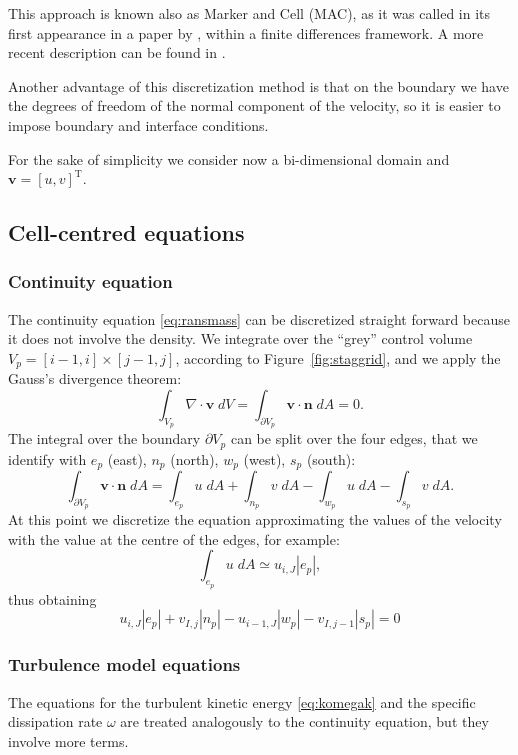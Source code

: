 This approach is known also as Marker and Cell (MAC), as it was called in its 
first appearance in a paper by \textcite{stagg:orig}, within a finite 
differences framework. A more recent description can be found in 
\cite{main:vermal}.

Another advantage of this discretization method is that on the boundary we have 
the degrees of freedom of the normal component of the velocity, so it is easier 
to impose boundary and interface conditions.

For the sake of simplicity we consider now a bi-dimensional domain and 
$\mathbf{v} = [u, v]^{\mathrm{T}}$.
%
\subsection{Cell-centred equations}
\subsubsection{Continuity equation}
The continuity equation \eqref{eq:ransmass} can be discretized straight forward 
because it does not involve the density. We integrate over the ``grey'' control 
volume $V_p = [i-1,i] \times [j-1,j]$, according to Figure~\ref{fig:staggrid}, 
and we apply the Gauss's divergence theorem:
\begin{equation}
\int_{V_p} \nabla \cdot \mathbf{v} \; dV = \int_{\partial V_p} \mathbf{v} \cdot 
\mathbf{n} \; dA = 0.
\end{equation}
The integral over the boundary $\partial V_p$ can be split over the four edges, 
that we identify with $e_p$ (east), $n_p$ (north), $w_p$ (west), $s_p$ (south):
\begin{equation}
\int_{\partial V_p} \mathbf{v} \cdot \mathbf{n} \; dA = \int_{e_p} u \; dA
+ \int_{n_p} v \; dA - \int_{w_p} u \; dA - \int_{s_p} v \; dA.
\end{equation}
At this point we discretize the equation approximating the values of the 
velocity with the value at the centre of the edges, for example:
\begin{equation}
\int_{e_p} u \; dA \simeq u_{i,J} |{e_p}|,
\end{equation}
thus obtaining
\begin{equation}
	u_{i,J} |e_p| + v_{I,j}|n_p| - u_{i-1,J}|w_p| - v_{I,j-1}|s_p| = 0
\end{equation}
\subsubsection{Turbulence model equations}
The equations for the turbulent kinetic energy \eqref{eq:komegak} and the 
specific dissipation rate $\omega$ are treated analogously to the continuity 
equation, but they involve more terms.

